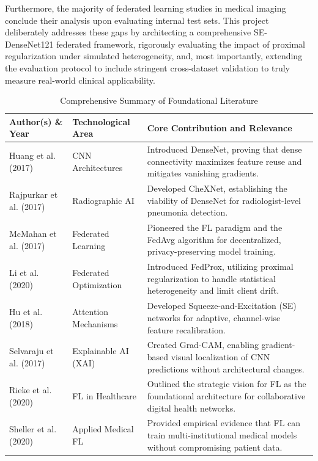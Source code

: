 \documentclass[12pt,a4paper]{report}
\begin{document}
Furthermore, the majority of federated learning studies in medical imaging conclude their analysis upon evaluating internal test sets. This project deliberately addresses these gaps by architecting a comprehensive SE-DenseNet121 federated framework, rigorously evaluating the impact of proximal regularization under simulated heterogeneity, and, most importantly, extending the evaluation protocol to include stringent cross-dataset validation to truly measure real-world clinical applicability.

\begin{table}[H]
\centering
\caption{Comprehensive Summary of Foundational Literature}
\label{tab:literature_summary}
\begin{tabular}{p{3.0cm}p{3.5cm}p{6.5cm}}
\toprule
\textbf{Author(s) \& Year} & \textbf{Technological Area} & \textbf{Core Contribution and Relevance} \\
\midrule
Huang et al. (2017) & CNN Architectures & Introduced DenseNet, proving that dense connectivity maximizes feature reuse and mitigates vanishing gradients.\\
Rajpurkar et al. (2017) & Radiographic AI & Developed CheXNet, establishing the viability of DenseNet for radiologist-level pneumonia detection.\\
McMahan et al. (2017) & Federated Learning & Pioneered the FL paradigm and the FedAvg algorithm for decentralized, privacy-preserving model training.\\
Li et al. (2020) & Federated Optimization & Introduced FedProx, utilizing proximal regularization to handle statistical heterogeneity and limit client drift.\\
Hu et al. (2018) & Attention Mechanisms & Developed Squeeze-and-Excitation (SE) networks for adaptive, channel-wise feature recalibration.\\
Selvaraju et al. (2017) & Explainable AI (XAI) & Created Grad-CAM, enabling gradient-based visual localization of CNN predictions without architectural changes.\\
Rieke et al. (2020) & FL in Healthcare & Outlined the strategic vision for FL as the foundational architecture for collaborative digital health networks.\\
Sheller et al. (2020) & Applied Medical FL & Provided empirical evidence that FL can train multi-institutional medical models without compromising patient data.\\
\bottomrule
\end{tabular}
\end{table}
\end{document}
